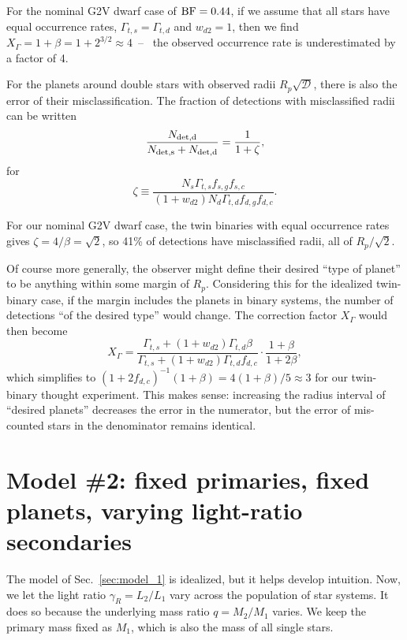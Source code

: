 \documentclass{emulateapj}
\begin{document}
For the nominal G2V dwarf case of ${\rm BF}=0.44$, if we assume that all stars 
have equal occurrence rates, $\Gamma_{t,s} = \Gamma_{t,d}$ and 
$w_{d2}=1$, then we find $X_\Gamma = 1+\beta = 1+ 2^{3/2}\approx4$~--~ the 
observed occurrence rate is underestimated by a factor of 4.


For the planets around double stars with observed radii $R_p 
\sqrt{\mathcal{D}}$, there is also the error of their misclassification.
The fraction of detections with misclassified radii can be written
\begin{equation}
\frac{N_{\rm det,d}}{N_{\rm det,s} + N_{\rm det,d}} = \frac{1}{1+\zeta},
\end{equation}
for
\begin{equation}
\zeta \equiv \frac{N_s \Gamma_{t,s} f_{s,g} f_{s,c}}{
	 (1+w_{d2})N_d \Gamma_{t,d} f_{d,g} f_{d,c }}.
\end{equation}

For our nominal G2V dwarf case, the twin binaries with equal 
occurrence rates gives $\zeta = 4/\beta = \sqrt{2}$, so 41\% of detections 
have misclassified radii, all of $R_p/\sqrt{2}$.

Of course more generally, the observer might define their 
desired ``type of planet'' to be anything within some margin of $R_p$.
Considering this for the idealized twin-binary case, if the margin includes 
the planets in binary systems, the number of detections ``of the desired 
type'' would change.
The correction factor $X_\Gamma$ would then become
\begin{equation}
X_\Gamma = 
\frac{\Gamma_{t,s} + (1+w_{d2})\Gamma_{t,d}\beta}{\Gamma_{t,s} + 
(1+w_{d2})\Gamma_{t,d} f_{d,c} } \cdot 
\frac{1+\beta}{1+2\beta},
\end{equation}
which simplifies to $(1+2f_{d,c})^{-1} (1+\beta) = 4(1+\beta)/5\approx 3$ for 
our twin-binary thought experiment.
This makes sense: increasing the radius interval of ``desired planets'' 
decreases the error in the numerator, but the error of mis-counted stars in 
the denominator remains identical.


\section{Model \#2: fixed primaries, fixed planets, varying light-ratio 
secondaries}
\label{sec:model_2}

The model of Sec.~\ref{sec:model_1} is idealized, but it helps
develop intuition.
Now, we let the light ratio $\gamma_R = L_2/L_1$ vary across the population 
of star systems.
It does so because the underlying mass ratio $q=M_2/M_1$ varies.
We keep the primary mass fixed as $M_1$, which is also the mass of all single 
stars.
\end{document}
